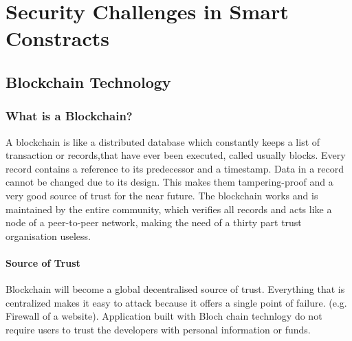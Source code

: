 \chapter{Security Challenges in Smart Constracts}


\newpage

\minitoc %

\newpage


\section{Blockchain Technology}
\subsection{What is a Blockchain?}
A blockchain is like a distributed database which constantly keeps a list of transaction or records,that have ever been executed, called usually blocks. Every record contains a reference to its predecessor and a timestamp.
Data in a record cannot be changed due to its design. This makes them tampering-proof and a very good source of trust for the near future.
The blockchain works and is maintained by the entire community, which verifies all records and acts like a node of a peer-to-peer network, making the need of a thirty part trust organisation useless.
\subsubsection{Source of Trust}
Blockchain will become a global decentralised source of trust.
Everything that is centralized makes it easy to attack because it offers a single point of failure. 
(e.g. Firewall of a website). 
Application built with Bloch chain technlogy do not require  users to trust the developers with personal information or funds. 
